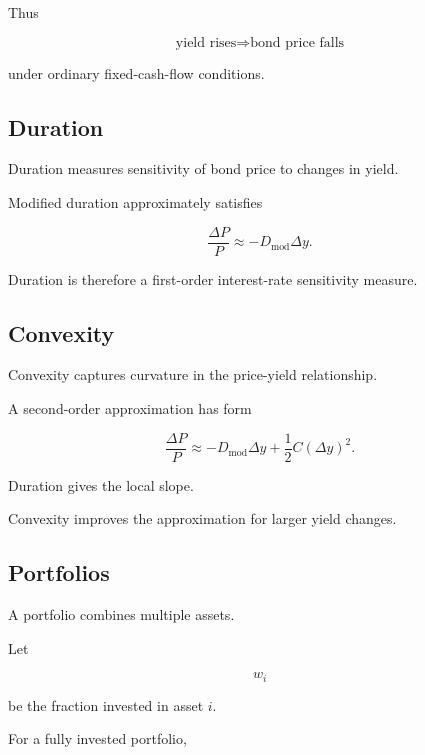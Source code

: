 Thus

\[
\boxed{
\text{yield rises}
\Rightarrow
\text{bond price falls}
}
\]

under ordinary fixed-cash-flow conditions.

\subsection{Duration}
\label{subsec:bond-duration}

Duration measures sensitivity of bond price to changes in yield.

Modified duration approximately satisfies

\[
\boxed{
\frac{\Delta P}{P}
\approx
-D_{\mathrm{mod}}\Delta y.
}
\]

Duration is therefore a first-order interest-rate sensitivity measure.

\subsection{Convexity}
\label{subsec:bond-convexity}

Convexity captures curvature in the price-yield relationship.

A second-order approximation has form

\[
\boxed{
\frac{\Delta P}{P}
\approx
-D_{\mathrm{mod}}\Delta y
+
\frac12C(\Delta y)^2.
}
\]

Duration gives the local slope.

Convexity improves the approximation for larger yield changes.

\subsection{Portfolios}
\label{subsec:financial-portfolios}

A portfolio combines multiple assets.

Let

\[
w_i
\]

be the fraction invested in asset \(i\).

For a fully invested portfolio,

